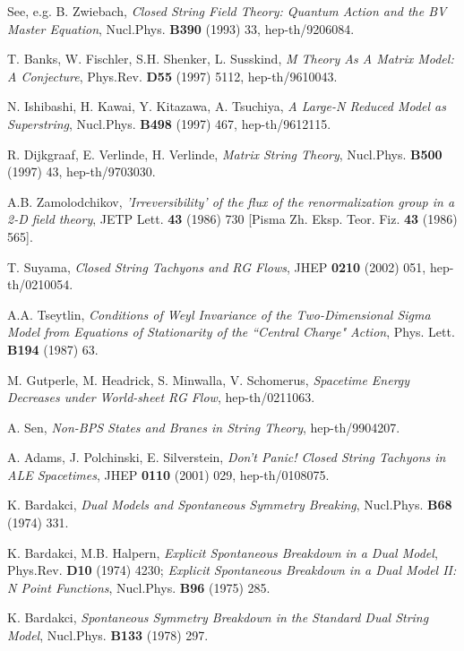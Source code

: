 \documentclass[a4paper,a4paper]{article}
\begin{document}
\begin{thebibliography}{99}

See, e.g. 
B. Zwiebach, 
{\it Closed String Field Theory: Quantum Action and the BV Master Equation}, 
Nucl.Phys. {\bf B390} (1993) 33, hep-th/9206084. 

T. Banks, W. Fischler, S.H. Shenker, L. Susskind, 
{\it M Theory As A Matrix Model: A Conjecture}, 
Phys.Rev. {\bf D55} (1997) 5112, hep-th/9610043. 

N. Ishibashi, H. Kawai, Y. Kitazawa, A. Tsuchiya, 
{\it A Large-N Reduced Model as Superstring}, 
Nucl.Phys. {\bf B498} (1997) 467, hep-th/9612115. 

R. Dijkgraaf, E. Verlinde, H. Verlinde, 
{\it Matrix String Theory}, 
Nucl.Phys. {\bf B500} (1997) 43, hep-th/9703030. 

A.B. Zamolodchikov, 
{\it 'Irreversibility' of the flux of the renormalization group in a 2-D field theory}, 
JETP Lett. {\bf 43} (1986) 730 [Pisma Zh. Eksp. Teor. Fiz. {\bf 43} (1986) 565]. 

T. Suyama, 
{\it Closed String Tachyons and RG Flows}, 
JHEP {\bf 0210} (2002) 051, hep-th/0210054. 

A.A. Tseytlin, 
{\it Conditions of Weyl Invariance of the Two-Dimensional Sigma Model from Equations of Stationarity of the 
``Central Charge" Action}, 
Phys. Lett. {\bf B194} (1987) 63. 

M. Gutperle, M. Headrick, S. Minwalla, V. Schomerus, 
{\it Spacetime Energy Decreases under World-sheet RG Flow}, 
hep-th/0211063. 

A. Sen, 
{\it Non-BPS States and Branes in String Theory}, 
hep-th/9904207. 

A. Adams, J. Polchinski, E. Silverstein, 
{\it Don't Panic! Closed String Tachyons in ALE Spacetimes}, 
JHEP {\bf 0110} (2001) 029, hep-th/0108075. 

K. Bardakci, 
{\it Dual Models and Spontaneous Symmetry Breaking}, 
Nucl.Phys. {\bf B68} (1974) 331.

K. Bardakci, M.B. Halpern, 
{\it Explicit Spontaneous Breakdown in a Dual Model}, 
Phys.Rev. {\bf D10} (1974) 4230; 
{\it Explicit Spontaneous Breakdown in a Dual Model II: N Point Functions}, 
Nucl.Phys. {\bf B96} (1975) 285.

K. Bardakci, 
{\it Spontaneous Symmetry Breakdown in the Standard Dual String Model}, 
Nucl.Phys. {\bf B133} (1978) 297. 


\end{thebibliography}
\end{document}
